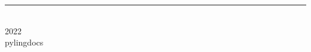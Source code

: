 \begin{titlingpage}
\BgThispage
{}
\vspace*{2cm}
\centering
\textcolor{white}{  }
\vspace*{3cm}\par
\noindent
{
\raggedleft
\begin{minipage}{0.90\linewidth}
\end{minipage} \hspace{15pt}
}
\centering
\vfill
\rule{0.4\textwidth}{0.4pt}\\
{\Huge 2022 \\ \large pylingdocs }
\end{titlingpage}
